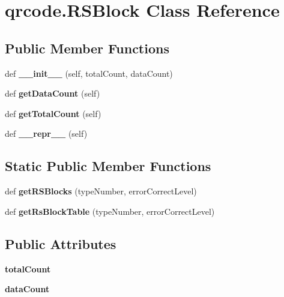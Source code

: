 \hypertarget{classqrcode_1_1_r_s_block}{}\section{qrcode.\+R\+S\+Block Class Reference}
\label{classqrcode_1_1_r_s_block}
\subsection*{Public Member Functions}
\begin{DoxyCompactItemize}
\item 
\mbox{\label{classqrcode_1_1_r_s_block_a9ee7edbbb2cd7829d3fd3f2e4b23d54b}} 
def {\bfseries \+\_\+\+\_\+init\+\_\+\+\_\+} (self, total\+Count, data\+Count)
\item 
\mbox{\label{classqrcode_1_1_r_s_block_ae6108a761700050ea1ea394f755bffff}} 
def {\bfseries get\+Data\+Count} (self)
\item 
\mbox{\label{classqrcode_1_1_r_s_block_a417b52bb950e505100a56ed61ed4817c}} 
def {\bfseries get\+Total\+Count} (self)
\item 
\mbox{\label{classqrcode_1_1_r_s_block_ab68afcbec029ff6477bc9c445d63d701}} 
def {\bfseries \+\_\+\+\_\+repr\+\_\+\+\_\+} (self)
\end{DoxyCompactItemize}
\subsection*{Static Public Member Functions}
\begin{DoxyCompactItemize}
\item 
\mbox{\label{classqrcode_1_1_r_s_block_a055b276bc08ab70e254aaef4ed698c67}} 
def {\bfseries get\+R\+S\+Blocks} (type\+Number, error\+Correct\+Level)
\item 
\mbox{\label{classqrcode_1_1_r_s_block_a374805c95bbdad510e2369cae5f7e3d9}} 
def {\bfseries get\+Rs\+Block\+Table} (type\+Number, error\+Correct\+Level)
\end{DoxyCompactItemize}
\subsection*{Public Attributes}
\begin{DoxyCompactItemize}
\item 
\mbox{\label{classqrcode_1_1_r_s_block_a7b5067a53b7b80307a7b6e9b479c3b14}} 
{\bfseries total\+Count}
\item 
\mbox{\label{classqrcode_1_1_r_s_block_a68482edec134daf9e03586456c8d3a4e}} 
{\bfseries data\+Count}
\end{DoxyCompactItemize}
